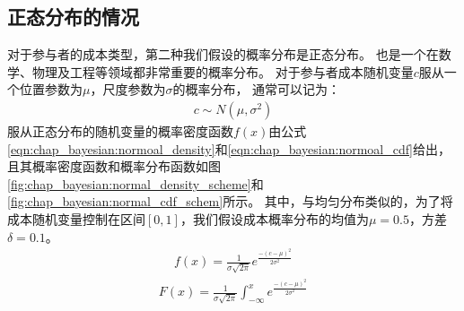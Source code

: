 \subsection{正态分布的情况}
对于参与者的成本类型，第二种我们假设的概率分布是正态分布。
也是一个在数学、物理及工程等领域都非常重要的概率分布。
对于参与者成本随机变量$c$服从一个位置参数为$\mu$，尺度参数为$\sigma$的概率分布，
通常可以记为：
\begin{align*}
    c \sim N(\mu, \sigma^2)
\end{align*}
服从正态分布的随机变量的概率密度函数$f(x)$由公式\ref{eqn:chap_bayesian:normoal_density}和\ref{eqn:chap_bayesian:normoal_cdf}给出，
且其概率密度函数和概率分布函数如图\ref{fig:chap_bayesian:normal_density_scheme}和\ref{fig:chap_bayesian:normal_cdf_schem}所示。
其中，与均匀分布类似的，为了将成本随机变量控制在区间$[0,1]$，我们假设成本概率分布的均值为$\mu = 0.5$，方差$\delta = 0.1$。
\begin{align}
    f(x) = \frac{1}{\sigma \sqrt{2\pi} } e^{ \frac{-(c-\mu)^2}{2\sigma^2}}
    \label{eqn:chap_bayesian:normoal_density}
\end{align}
\begin{align}
    F(x) = \frac{1}{\sigma \sqrt{2\pi} } \int^x_{-\infty}e^{ \frac{-(c-\mu)^2}{2\sigma^2}}
    \label{eqn:chap_bayesian:normoal_cdf}
\end{align}
